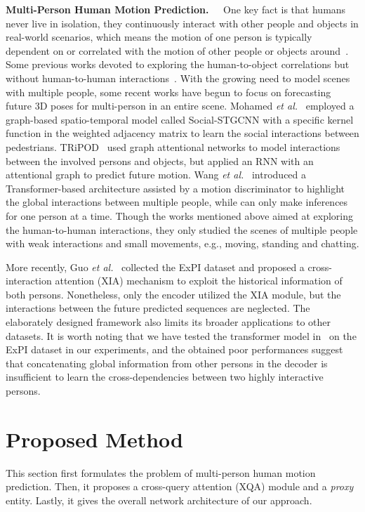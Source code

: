 \documentclass[10pt,twocolumn,letterpaper]{article}
\begin{document}
\vspace{0.5em}
\noindent\textbf{Multi-Person Human Motion Prediction.~~} 
One key fact is that humans never live in isolation, they continuously interact with other people and objects in real-world scenarios, which means the motion of one person is typically dependent on or correlated with the motion of other people or objects around~\cite{wang2021multiperson, guo2021multi}. 
Some previous works devoted to exploring the human-to-object correlations but without human-to-human interactions~\cite{corona2020context, caoHMP2020}.
With the growing need to model scenes with multiple people, some recent works have begun to focus on forecasting future 3D poses for multi-person in an entire scene. 
Mohamed \textit{et al.}~\cite{mohamed2020social} employed a graph-based spatio-temporal model called Social-STGCNN with a specific kernel function in the weighted adjacency matrix to learn the social interactions between pedestrians.
TRiPOD~\cite{Adeli2021TRiPOD} used graph attentional networks to model interactions between the involved persons and objects, but applied an RNN with an attentional graph to predict future motion. 
Wang \textit{et al.}~\cite{wang2021multiperson} introduced a Transformer-based architecture assisted by a motion discriminator to highlight the global interactions between multiple people, while can only make inferences for one person at a time.
Though the works mentioned above aimed at exploring the human-to-human interactions, they only studied the scenes of multiple people with weak interactions and small movements, e.g., moving, standing and chatting.

More recently, Guo \textit{et al.}~\cite{guo2021multi} collected the ExPI dataset and proposed a cross-interaction attention (XIA) mechanism to exploit the historical information of both persons.
Nonetheless, only the encoder utilized the XIA module, but the interactions between the future predicted sequences are neglected.
The elaborately designed framework also limits its broader applications to other datasets.
It is worth noting that we have tested the transformer model in~\cite{wang2021multiperson} on the ExPI dataset in our experiments, and the obtained poor performances suggest that concatenating global information from other persons in the decoder is insufficient to learn the cross-dependencies between two highly interactive persons.




\section{Proposed Method}\label{sec:method}
This section first formulates the problem of multi-person human motion prediction. 
Then, it proposes a cross-query attention (XQA) module and a \textit{proxy} entity.
Lastly, it gives the overall network architecture of our approach. 
\end{document}

